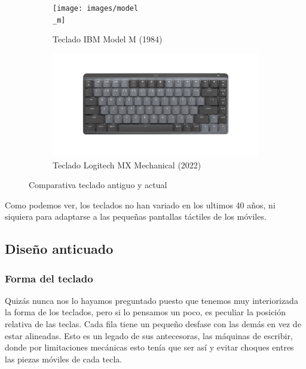 \begin{figure}[H]
  \begin{subfigure}[b]{.5\textwidth}
    \centering
    \texttt{[image: images/model\\\_m]}
    \caption{Teclado IBM Model M (1984)}
  \end{subfigure} 
  \hfill
  \begin{subfigure}[b]{.5\textwidth}
    \centering
    \includegraphics[width=\textwidth]{images/logitech}
    \caption{Teclado Logitech MX Mechanical (2022)}
  \end{subfigure}
  \caption{Comparativa teclado antiguo y actual}
\end{figure}


Como podemos ver, los teclados no han variado en los ultimos 40 años, ni siquiera para adaptarse a las pequeñas pantallas táctiles de los móviles.

\subsection{Diseño anticuado}
  \subsubsection{Forma del teclado}
  Quizás nunca nos lo hayamos preguntado puesto que tenemos muy interiorizada la forma de los teclados, pero si lo pensamos un poco, es peculiar la posición relativa de las teclas. Cada fila tiene un pequeño desfase con las demás en vez de estar alineadas. Esto es un legado de sus antecesoras, las máquinas de escribir, donde por limitaciones mecánicas esto tenía que ser así y evitar choques entres las piezas móviles de cada tecla.

